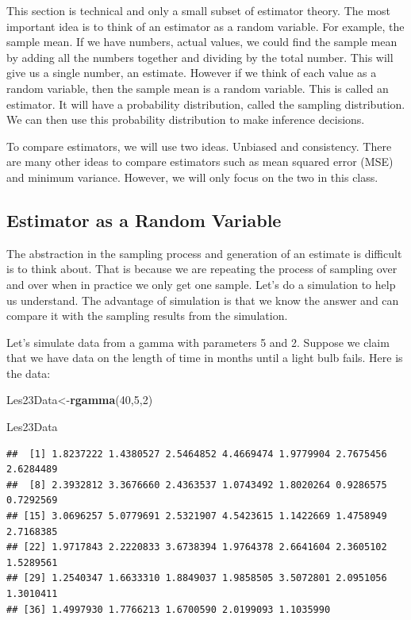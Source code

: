 \documentclass[]{book}
\newenvironment{Shaded}{\begin{snugshade}}{\end{snugshade}}
\newcommand{\KeywordTok}[1]{\textcolor[rgb]{0.13,0.29,0.53}{\textbf{#1}}}
\newcommand{\DecValTok}[1]{\textcolor[rgb]{0.00,0.00,0.81}{#1}}
\newcommand{\NormalTok}[1]{#1}
\theoremstyle{definition}
\theoremstyle{definition}
\theoremstyle{definition}
\theoremstyle{remark}
\begin{document}
This section is technical and only a small subset of estimator theory.
The most important idea is to think of an estimator as a random
variable. For example, the sample mean. If we have numbers, actual
values, we could find the sample mean by adding all the numbers together
and dividing by the total number. This will give us a single number, an
estimate. However if we think of each value as a random variable, then
the sample mean is a random variable. This is called an estimator. It
will have a probability distribution, called the sampling distribution.
We can then use this probability distribution to make inference
decisions.

To compare estimators, we will use two ideas. Unbiased and consistency.
There are many other ideas to compare estimators such as mean squared
error (MSE) and minimum variance. However, we will only focus on the two
in this class.

\subsection{Estimator as a Random
Variable}\label{estimator-as-a-random-variable}

The abstraction in the sampling process and generation of an estimate is
difficult is to think about. That is because we are repeating the
process of sampling over and over when in practice we only get one
sample. Let's do a simulation to help us understand. The advantage of
simulation is that we know the answer and can compare it with the
sampling results from the simulation.

Let's simulate data from a gamma with parameters 5 and 2. Suppose we
claim that we have data on the length of time in months until a light
bulb fails. Here is the data:

\begin{Shaded}
\begin{Highlighting}[]
\NormalTok{Les23Data<-}\KeywordTok{rgamma}\NormalTok{(}\DecValTok{40}\NormalTok{,}\DecValTok{5}\NormalTok{,}\DecValTok{2}\NormalTok{)}
\end{Highlighting}
\end{Shaded}

\begin{Shaded}
\begin{Highlighting}[]
\NormalTok{Les23Data}
\end{Highlighting}
\end{Shaded}

\begin{verbatim}
##  [1] 1.8237222 1.4380527 2.5464852 4.4669474 1.9779904 2.7675456 2.6284489
##  [8] 2.3932812 3.3676660 2.4363537 1.0743492 1.8020264 0.9286575 0.7292569
## [15] 3.0696257 5.0779691 2.5321907 4.5423615 1.1422669 1.4758949 2.7168385
## [22] 1.9717843 2.2220833 3.6738394 1.9764378 2.6641604 2.3605102 1.5289561
## [29] 1.2540347 1.6633310 1.8849037 1.9858505 3.5072801 2.0951056 1.3010411
## [36] 1.4997930 1.7766213 1.6700590 2.0199093 1.1035990
\end{verbatim}
\end{document}
